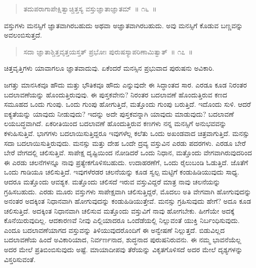 \vspace{-0.3cm}

\begin{verse}
ತದುಪರಾಗಾಪೇಕ್ಷಿತ್ವಾಚ್ಚಿತ್ತಸ್ಯ ವಸ್ತುಜ್ಞಾತಾಜ್ಞಾತಮ್​~॥ ೧೬~॥
\end{verse}

\vspace{-0.3cm}

ವಸ್ತುಗಳು ಮನಸ್ಸಿಗೆ ಜ್ಞಾತವಾಗಿರಬಹುದು ಅಥವಾ ಅಜ್ಞಾತವಾಗಿರಬಹುದು. ಅವು ಮನಸ್ಸಿಗೆ ಕೊಡುವ ಬಣ್ಣವನ್ನು ಅವಲಂಬಿಸುತ್ತದೆ. 

\vspace{-0.3cm}

\begin{verse}
ಸದಾ ಜ್ಞಾತಾಶ್ಚಿತ್ತವೃತ್ತಯಸ್ತತ್​ ಪ್ರಭೋಃ ಪುರುಷಸ್ಯಾಪರಿಣಾಮಿತ್ವಾತ್​~॥ ೧೭~॥
\end{verse}

\vspace{-0.3cm}

ಚಿತ್ತವೃತ್ತಿಗಳು ಯಾವಾಗಲೂ ಜ್ಞಾತವಾದುವು. ಏಕೆಂದರೆ ಮನಸ್ಸಿನ ಪ್ರಭುವಾದ ಪುರುಷನು ಅವಿಕಾರಿ. 

ಜಗತ್ತು ಮಾನಸಿಕವೂ ಹೌದು ಮತ್ತು ಭೌತಿಕವೂ ಹೌದು ಎನ್ನುವುದೇ ಈ ಸಿದ್ಧಾಂತದ ಸಾರ. ಎರಡೂ ಕೂಡ ನಿರಂತರ ಬದಲಾವಣೆಯನ್ನು ಹೊಂದುತ್ತಿರುವುವು. ಈ ಪುಸ್ತಕವೇನು? ನಿರಂತರ ಬದಲಾವಣೆ ಹೊಂದುತ್ತಿರುವ ಕಣದ ಸಮೂಹದ ಒಂದು ಗುಂಪು. ಒಂದು ಗುಂಪು ಹೋಗುತ್ತಿದೆ, ಮತ್ತೊಂದು ಗುಂಪು ಬರುತ್ತಿದೆ. ಇದೊಂದು ಸುಳಿ. ಆದರೆ ಐಕ್ಯತೆಯನ್ನು ಯಾವುದು ನೀಡುವುದು? ಇದನ್ನು ಅದೇ ಪುಸ್ತಕವನ್ನಾಗಿ ಯಾವುದು ಮಾಡುವುದು? ಬದಲಾವಣೆ ಲಯಬದ್ಧವಾಗಿದೆ. ಏಕರೀತಿಯಿಂದ ಬದಲಾವಣೆ ಹೊಂದುತ್ತಿರುವ ಕಣಗಳು ನನ್ನ ಮನಸ್ಸಿಗೆ ಅನುಭವವನ್ನು ಕಳುಹಿಸುತ್ತಿವೆ. ಭಾಗಗಳು ಬದಲಾಯಿಸುತ್ತಿದ್ದರೂ ಇವುಗಳೆಲ್ಲ ಕಲೆತು ಒಂದು ಅಖಂಡವಾದ ಚಿತ್ರವಾಗುತ್ತಿದೆ. ಮನಸ್ಸು ಸದಾ ಬದಲಾಯಿಸುತ್ತಿರುವುದು. ಮನಸ್ಸು ಮತ್ತು ದೇಹ ಒಂದೇ ದ್ರವ್ಯ ವಸ್ತುವಿನ ಎರಡು ಪದರಗಳು. ಎರಡೂ ಬೇರೆ ಬೇರೆ ವೇಗದಲ್ಲಿ ಚಲಿಸುತ್ತಿವೆ. ಸಾಪೇಕ್ಷ ದೃಷ್ಟಿಯಿಂದ ನೋಡಿದರೆ ಒಂದು ನಿಧಾನ, ಮತ್ತೊಂದು ವೇಗವಾಗಿರುವುದರಿಂದ ಈ ಎರಡು ಚಲನೆಗಳನ್ನೂ ನಾವು ಪ್ರತ್ಯೇಕಗೊಳಿಸಬಹುದು. ಉದಾಹರಣೆಗೆ, ಒಂದು ರೈಲುಬಂಡಿ ಓಡುತ್ತಿದೆ. ಜೊತೆಗೆ ಒಂದು ಗಾಡಿಯೂ ಚಲಿಸುತ್ತಿದೆ. ಇವುಗಳೆರಡರ ಚಲನೆಯನ್ನು ಕೂಡ ಸ್ವಲ್ಪ ಮಟ್ಟಿಗೆ ಕಂಡುಹಿಡಿಯುವುದು ಸಾಧ್ಯ. ಆದರೂ ಮತ್ತೊಂದು ಆವಶ್ಯಕ. ಮತ್ತೊಂದು ಚಲಿಸದೆ ಇರುವ ವಸ್ತುವಿದ್ದರೆ ಮಾತ್ರ ನಾವು ಚಲನೆಯನ್ನು ಗ್ರಹಿಸಬಹುದು. ಎರಡು ಮೂರು ವಸ್ತುಗಳು ಸಾಪೇಕ್ಷವಾಗಿ ಚಲಿಸುತ್ತಿದ್ದರೆ, ಮೊದಲು ಅತಿ ವೇಗವಾಗಿ ಹೋಗುವುದನ್ನು ಅನಂತರ ಅದಕ್ಕಿಂತ ನಿಧಾನವಾಗಿ ಹೋಗುವುದನ್ನು ಕಂಡುಹಿಡಿಯುತ್ತೇವೆ. ಮನಸ್ಸು ಗ್ರಹಿಸುವುದು ಹೇಗೆ? ಅದೂ ಕೂಡ ಚಲಿಸುತ್ತಿದೆ. ಅದಕ್ಕಿಂತ ನಿಧಾನವಾಗಿ ಚಲಿಸುವ ಮತ್ತೊಂದು ವಸ್ತುವಿಗೆ ನಾವು ಹೋಗಬೇಕು. ಹೀಗೆಯೇ ಅದಕ್ಕೆ ಕೊನೆಯಿರುವುದಿಲ್ಲ. ಆದಕಾರಣವೆ ನೀವು ಎಲ್ಲಿಯಾದರೂ ಒಂದೆಡೆಯಲ್ಲಿ ನಿಲ್ಲುವಂತೆ ಯುಕ್ತಿ ನಿರ್ಬಂಧಿಸುವುದು. ಎಂದೂ ಬದಲಾವಣೆಯಾಗದ ವಸ್ತುವನ್ನು ತಿಳಿಯುವುದರೊಂದಿಗೆ ಈ ಅನ್ವೇಷಣೆ ನಿಲ್ಲುತ್ತದೆ. ಬಿಡುವಿಲ್ಲದ ಬದಲಾವಣೆಯ ಹಿಂದೆ ಅವಿಕಾರಿಯಾದ, ನಿರ್ವರ್ಣನಾದ, ಶುದ್ಧನಾದ ಪುರುಷನಿರುವನು. ಈ ನಮ್ಮ ಭಾವನೆಯೆಲ್ಲ ಅದರ ಮೇಲೆ ಪ್ರತಿಬಿಂಬಿಸುವುದು ಅಷ್ಟೆ. ಮಾಯಾದೀಪವು ತೆರೆಯನ್ನು ವಿಕೃತಗೊಳಿಸದೆ ಅದರ ಮೇಲೆ ದೃಶ್ಯಗಳನ್ನು ವಿಸ್ತರಿಸುವಂತೆ. 

